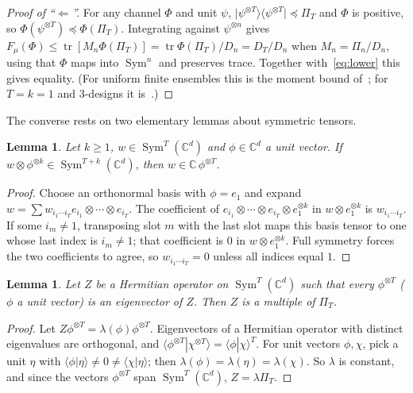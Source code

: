\documentclass[11pt]{article}
\newcommand{\C}{\mathbb{C}}
\newcommand{\tr}{\operatorname{tr}}
\newcommand{\Sym}{\operatorname{Sym}}
\newcommand{\ket}[1]{\lvert #1\rangle}
\newcommand{\bra}[1]{\langle #1\rvert}
\newtheorem{lemma}[theorem]{Lemma}
\theoremstyle{definition}
\theoremstyle{remark}
\begin{document}
\begin{proof}[Proof of ``$\Leftarrow$'']
For any channel $\Phi$ and unit $\psi$, $\ket{\psi^{\otimes T}}\!\bra{\psi^{\otimes T}}\preceq\Pi_T$ and $\Phi$ is
positive, so $\Phi(\psi^{\otimes T})\preceq\Phi(\Pi_T)$. Integrating against $\psi^{\otimes n}$ gives
$F_\mu(\Phi)\le\tr[M_n\Phi(\Pi_T)]=\tr\Phi(\Pi_T)/D_n=D_T/D_n$ when $M_n=\Pi_n/D_n$, using that $\Phi$ maps into
$\Sym^n$ and preserves trace. Together with~\eqref{eq:lower} this gives equality. (For uniform finite ensembles this is
the moment bound of~\cite[Lemma~5]{Weldon2026}; for $T=k=1$ and 3-designs it is~\cite[Prop.~4]{MVW2012}.)
\end{proof}

The converse rests on two elementary lemmas about symmetric tensors.

\begin{lemma}\label{lem:A}
Let $k\ge1$, $w\in\Sym^T(\C^d)$ and $\phi\in\C^d$ a unit vector. If $w\otimes\phi^{\otimes k}\in\Sym^{T+k}(\C^d)$, then
$w\in\C\,\phi^{\otimes T}$.
\end{lemma}
\begin{proof}
Choose an orthonormal basis with $\phi=e_1$ and expand $w=\sum w_{i_1\cdots i_T}e_{i_1}\otimes\cdots\otimes e_{i_T}$.
The coefficient of $e_{i_1}\otimes\cdots\otimes e_{i_T}\otimes e_1^{\otimes k}$ in $w\otimes e_1^{\otimes k}$ is
$w_{i_1\cdots i_T}$. If some $i_m\ne1$, transposing slot $m$ with the last slot maps this basis tensor to one whose
last index is $i_m\ne1$; that coefficient is $0$ in $w\otimes e_1^{\otimes k}$. Full symmetry forces the two
coefficients to agree, so $w_{i_1\cdots i_T}=0$ unless all indices equal $1$.
\end{proof}

\begin{lemma}\label{lem:B}
Let $Z$ be a Hermitian operator on $\Sym^T(\C^d)$ such that every $\phi^{\otimes T}$ ($\phi$ a unit vector) is an
eigenvector of $Z$. Then $Z$ is a multiple of $\Pi_T$.
\end{lemma}
\begin{proof}
Let $Z\phi^{\otimes T}=\lambda(\phi)\phi^{\otimes T}$. Eigenvectors of a Hermitian operator with distinct eigenvalues
are orthogonal, and $\langle\phi^{\otimes T}|\chi^{\otimes T}\rangle=\langle\phi|\chi\rangle^T$. For unit vectors
$\phi,\chi$, pick a unit $\eta$ with $\langle\phi|\eta\rangle\ne0\ne\langle\chi|\eta\rangle$; then
$\lambda(\phi)=\lambda(\eta)=\lambda(\chi)$. So $\lambda$ is constant, and since the vectors $\phi^{\otimes T}$ span
$\Sym^T(\C^d)$, $Z=\lambda\Pi_T$.
\end{proof}
\end{document}

